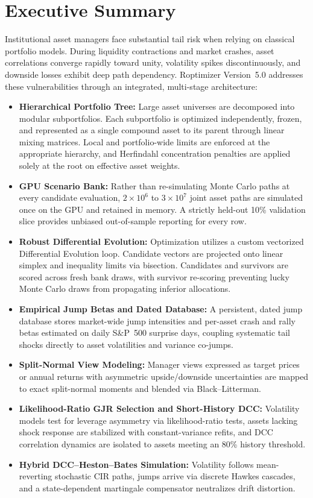 \documentclass[11pt]{article}
\begin{document}
\section{Executive Summary}
Institutional asset managers face substantial tail risk when relying on classical portfolio models.
During liquidity contractions and market crashes, asset correlations converge rapidly toward unity, volatility
spikes discontinuously, and downside losses exhibit deep path dependency. Roptimizer Version~5.0 addresses these
vulnerabilities through an integrated, multi-stage architecture:
\begin{itemize}[nosep]
\item \textbf{Hierarchical Portfolio Tree:} Large asset universes are decomposed into modular subportfolios.
Each subportfolio is optimized independently, frozen, and represented as a single compound asset to its parent
through linear mixing matrices. Local and portfolio-wide limits are enforced at the appropriate hierarchy,
and Herfindahl concentration penalties are applied solely at the root on effective asset weights.
\item \textbf{GPU Scenario Bank:} Rather than re-simulating Monte Carlo paths at every candidate evaluation,
$2\times 10^6$ to $3\times 10^7$ joint asset paths are simulated once on the GPU and retained in memory.
A strictly held-out 10\% validation slice provides unbiased out-of-sample reporting for every row.
\item \textbf{Robust Differential Evolution:} Optimization utilizes a custom vectorized Differential Evolution
loop. Candidate vectors are projected onto linear simplex and inequality limits via bisection. Candidates and
survivors are scored across fresh bank draws, with survivor re-scoring preventing lucky Monte Carlo draws
from propagating inferior allocations.
\item \textbf{Empirical Jump Betas and Dated Database:} A persistent, dated jump database stores market-wide
jump intensities and per-asset crash and rally betas estimated on daily S\&P~500 surprise days, coupling
systematic tail shocks directly to asset volatilities and variance co-jumps.
\item \textbf{Split-Normal View Modeling:} Manager views expressed as target prices or annual returns with
asymmetric upside/downside uncertainties are mapped to exact split-normal moments and blended via Black--Litterman.
\item \textbf{Likelihood-Ratio GJR Selection and Short-History DCC:} Volatility models test for leverage
asymmetry via likelihood-ratio tests, assets lacking shock response are stabilized with constant-variance
refits, and DCC correlation dynamics are isolated to assets meeting an 80\% history threshold.
\item \textbf{Hybrid DCC--Heston--Bates Simulation:} Volatility follows mean-reverting stochastic CIR paths,
jumps arrive via discrete Hawkes cascades, and a state-dependent martingale compensator neutralizes drift distortion.
\end{itemize}
\end{document}
